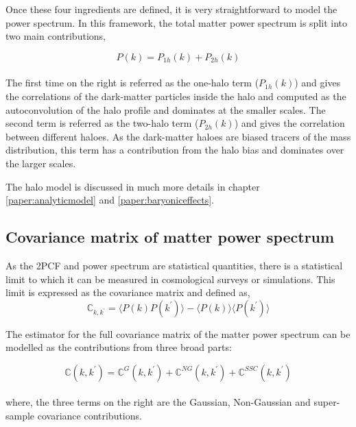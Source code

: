 Once these four ingredients are defined, 
it is very straightforward to model the power spectrum. In this framework, the
total matter power spectrum is split into two main contributions,

\begin{equation}
	P(k) = P_{1h}(k)  + P_{2h}(k)
\end{equation}
\\
The first time on the right is referred as the one-halo term ($P_{1h}(k)$) and gives
the correlations of the dark-matter particles inside the halo and computed as
the autoconvolution of the halo profile and dominates at the smaller scales. 
The second term is referred as the two-halo
term ($P_{2h}(k)$) and gives the correlation between different haloes. As the 
dark-matter haloes are biased tracers of the mass distribution, this term has a 
contribution from the halo bias and dominates over the larger scales. 

The halo model is discussed in much more details in chapter \ref{paper:analyticmodel} 
and \ref{paper:baryoniceffects}.


\subsection{Covariance matrix of matter power spectrum}
As the 2PCF and power spectrum are statistical quantities, there is a statistical limit
to which it can be measured in cosmological surveys or simulations. This limit is expressed
as the covariance matrix and defined as,
\begin{equation}
	\mathbb{C}_{k,k^{\prime}}	= 
			\langle P(k)P(k^{\prime}) \rangle - 
			\langle P(k)\rangle \langle P(k^{\prime})\rangle
\end{equation}

The estimator for the full covariance matrix of the matter power spectrum 
can be modelled as the contributions from three broad parts:

\begin{equation}
	\mathbb{C}(k,k^{\prime}) = \mathbb{C}^{G}(k,k^{\prime}) + 
								\mathbb{C}^{NG}(k,k^{\prime}) + 
								\mathbb{C}^{SSC}(k,k^{\prime})
\end{equation}
\\
where, the three terms on the right are the Gaussian, Non-Gaussian and super-sample covariance contributions. 

